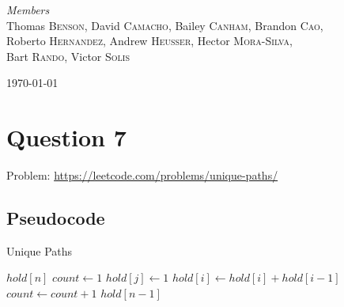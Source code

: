 \documentclass[11pt]{article}
\begin{document}
\begin{titlepage}
	{\large\textit{Members}}\\
	Thomas \textsc{Benson},
	David \textsc{Camacho},
	Bailey \textsc{Canham},
	Brandon \textsc{Cao},\\
	Roberto \textsc{Hernandez},
	Andrew \textsc{Heusser},
    Hector \textsc{Mora-Silva},\\
	Bart \textsc{Rando},
	Victor \textsc{Solis}

	\vfill\vfill\vfill 
	{\large\today} 

	\vfill 

\end{titlepage}


\tableofcontents
\newpage


\section{Question 7}
Problem: \url{https://leetcode.com/problems/unique-paths/}

\subsection{Pseudocode}

\begin{algorithm}
    \caption{Unique Paths}
    \label{alg:uniquePaths}
    \begin{algorithmic}[1]
            \State $hold[n]$
            \State $count \gets 1$
                \State $hold[j] \gets 1$
            \EndFor
                    \State $hold[i] \gets hold[i] + hold[i-1]$
                \EndFor
                \State $count \gets count + 1$
            \EndWhile
            \State \Return $hold[n-1]$
        \EndProcedure
    \end{algorithmic}
\end{algorithm}
\end{document}

